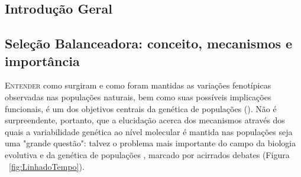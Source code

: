 \begin{refsection}
\chapter*{Introdução Geral}%







\section{Seleção Balanceadora: conceito, mecanismos e importância}%


%

\lettrine[lines=3]{\color{airforceblue}E}{ntender} como surgiram e como foram mantidas as variações fenotípicas observadas nas populações naturais, bem como suas possíveis implicações funcionais, é um dos objetivos centrais da genética de populações (\cite{Kimura1983,Dobzhansky1937}). Não é surpreendente, portanto, que a elucidação acerca dos mecanismos através dos quais a variabilidade genética ao nível molecular é mantida nas populações seja uma "grande questão": talvez o problema mais importante do campo da biologia evolutiva e da genética de populações \parencite{Kimura1983}, marcado por acirrados debates (Figura ~\ref{fig:LinhadoTempo}). 
%


\end{refsection}

